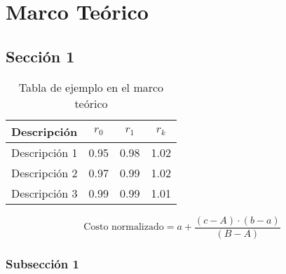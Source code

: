 \chapter{Marco Teórico}


\section{Sección 1}

\lipsum[6]

\begin{table}[H]
\centering
\caption{Tabla de ejemplo en el marco teórico}
\label{tab_ejemplo}
\begin{tabular}{lccc}
\toprule
\textbf{Descripción}     & \textbf{$r_{0}$} & \textbf{$r_{1}$} & \textbf{$r_{k}$} \\ 
\midrule
Descripción 1 & 0.95 & 0.98 & 1.02 \\
Descripción 2 & 0.97 & 0.99 & 1.02 \\
Descripción 3 & 0.99 & 0.99 & 1.01 \\ 
\bottomrule
\end{tabular}
\end{table}

\begin{equation}
    \text{Costo normalizado} = a + \frac{(c-A)\cdot(b-a)}{(B-A)}
\end{equation}

\subsection{Subsección 1}

\lipsum[7-8]

